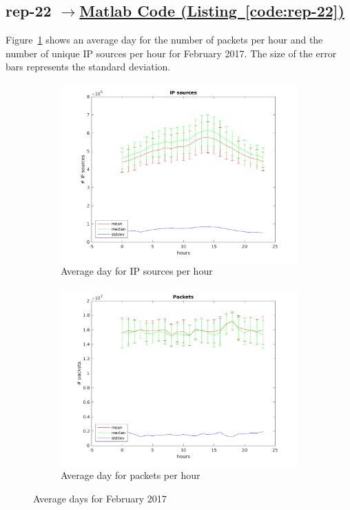 \documentclass{article}
\newcommand{\codelink}[1]{%
    \hyperref[#1]{\quad$\rightarrow$\enskip Matlab Code (Listing~\ref{#1})}%
}
\begin{document}
\subsection{rep-22 \codelink{code:rep-22}}

Figure~\ref{figure:rep-22} shows an average day for the number of packets per hour and the number of
unique IP sources per hour for February 2017. The size of the error bars represents the standard deviation.

\begin{figure}[h]
    \begin{subfigure}{.5\textwidth}
        \centering
        \includegraphics[width=\textwidth]{../exercise-3/plots/rep_22_ip_s}
        \caption{Average day for IP sources per hour}
    \end{subfigure}
    \begin{subfigure}{.5\textwidth}
        \centering
        \includegraphics[width=\textwidth]{../exercise-3/plots/rep_22_packets}
        \caption{Average day for packets per hour}
    \end{subfigure}
    \caption{\label{figure:rep-22} Average days for February 2017}
\end{figure}
\end{document}
